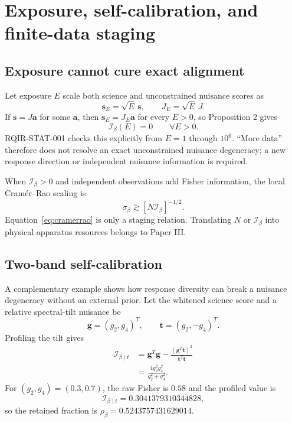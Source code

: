\section{Exposure, self-calibration, and finite-data staging}
\label{sec:detectability}

\subsection{Exposure cannot cure exact alignment}

Let exposure $E$ scale both science and unconstrained nuisance scores as
\begin{equation}
 \bm s_E=\sqrt E\,\bm s,
 \qquad J_E=\sqrt E\,J.
\end{equation}
If $\bm s=J\bm a$ for some $\bm a$, then $\bm s_E=J_E\bm a$ for every $E>0$, so Proposition 2 gives
\begin{equation}
 \mathcal I_\beta(E)=0\qquad\forall E>0.
\label{eq:exposureno}
\end{equation}
RQIR-STAT-001 checks this explicitly from $E=1$ through $10^6$. ``More data'' therefore does not resolve an exact unconstrained nuisance degeneracy; a new response direction or independent nuisance information is required.

When $\mathcal I_\beta>0$ and independent observations add Fisher information, the local Cram\'er--Rao scaling is
\begin{equation}
 \sigma_\beta\gtrsim [N\mathcal I_\beta]^{-1/2}.
\label{eq:cramerrao}
\end{equation}
Equation~\eqref{eq:cramerrao} is only a staging relation. Translating $N$ or $\mathcal I_\beta$ into physical apparatus resources belongs to Paper III.

\subsection{Two-band self-calibration}

A complementary example shows how response diversity can break a nuisance degeneracy without an external prior. Let the whitened science score and a relative spectral-tilt nuisance be
\begin{equation}
 \bm g=(g_2,g_4)^T,
 \qquad
 \bm t=(g_2,-g_4)^T.
\end{equation}
Profiling the tilt gives
\begin{align}
 \mathcal I_{\beta\mid t}
 &=\bm g^T\bm g-
 \frac{(\bm g^T\bm t)^2}{\bm t^T\bm t}\\
 &=\boxed{\displaystyle\frac{4g_2^2g_4^2}{g_2^2+g_4^2}}.
\label{eq:twoband}
\end{align}
For $(g_2,g_4)=(0.3,0.7)$, the raw Fisher is $0.58$ and the profiled value is
\begin{equation}
 \mathcal I_{\beta\mid t}=0.3041379310344828,
\end{equation}
so the retained fraction is $\rho_\beta=0.5243757431629014$.

